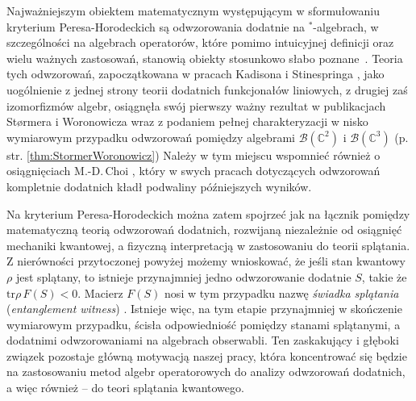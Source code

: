 Najważniejszym obiektem matematycznym występującym w sformułowaniu
kryterium Peresa-Horodeckich są odwzorowania dodatnie na $^{*}$-algebrach,
w szczególności na algebrach operatorów,
które pomimo intuicyjnej definicji oraz wielu ważnych zastosowań,
stanowią obiekty stosunkowo słabo
\mbox{poznane \cite{Stormer2013}}.
Teoria tych odwzorowań, zapoczątkowana w pracach
Kadisona \cite{kadison1952generalized}
i Stinespringa
\cite{stinespring1955positive},
jako uogólnienie z jednej strony teorii dodatnich funkcjonałów liniowych,
z drugiej zaś izomorfizmów algebr,
osiągnęła swój pierwszy ważny rezultat w publikacjach Størmera i Woronowicza
\cite{stormer1963positive,woronowicz1976positive}
wraz z podaniem pełnej charakteryzacji w nisko wymiarowym przypadku
odwzorowań pomiędzy algebrami $\mathcal{B}(\mathbb{C}^{2})$ i $\mathcal{B}(\mathbb{C}^{3})$
(p. str. \ref{thm:StormerWoronowicz})
Należy w tym miejscu wspomnieć również o osiągnięciach M.-D.\,Choi
\cite{choi1975positive,choi1975completely,choi1977extremal},
który w swych pracach dotyczących odwzorowań kompletnie dodatnich
kładł podwaliny późniejszych wyników.

Na kryterium Peresa-Horodeckich można zatem spojrzeć jak na łącznik pomiędzy
matematyczną teorią odwzorowań dodatnich,
rozwijaną niezależnie od osiągnięć mechaniki kwantowej,
a fizyczną interpretacją w zastosowaniu do teorii splątania.
Z nierówności przytoczonej powyżej %
możemy wnioskować,
że jeśli stan kwantowy $\rho$ jest splątany,
to istnieje przynajmniej jedno odwzorowanie dodatnie $S$,
takie że $\text{tr} \rho \, F(S) < 0$.
Macierz $F(S)$ nosi w tym przypadku nazwę
\emph{świadka splątania} (\emph{entanglement witness})
\cite{bourennane2004experimental}.
Istnieje więc,
na tym etapie przynajmniej w skończenie wymiarowym przypadku,
ścisła odpowiedniość pomiędzy stanami splątanymi,
a dodatnimi odwzorowaniami na algebrach obserwabli.
Ten zaskakujący i głęboki związek pozostaje główną motywacją naszej pracy,
która koncentrować się będzie na zastosowaniu metod algebr operatorowych
do analizy odwzorowań dodatnich,
a więc również -- do teori splątania kwantowego.

